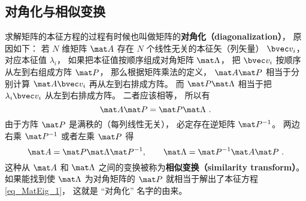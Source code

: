 \subsection{对角化与相似变换}
求解矩阵的本征方程的过程有时候也叫做矩阵的\textbf{对角化（diagonalization）}， 原因如下： 若 $N$ 维矩阵 $\mat A$ 存在 $N$ 个线性无关的本征矢（列矢量） $\bvec v_i$， 对应本征值 $\lambda_i$， 如果把本征值按顺序组成对角矩阵 $\mat \Lambda$， 把 $\bvec v_i$ 按顺序从左到右组成方阵 $\mat P$， 那么根据矩阵乘法的定义， $\mat A \mat P$ 相当于分别计算 $\mat A\bvec v_i$ 再从左到右排成方阵。 而 $\mat P\mat\Lambda$ 相当于把 $\lambda_i\bvec v_i$ 从左到右排成方阵。 二者应该相等， 所以有
\begin{equation}
\mat A \mat P = \mat P\mat\Lambda~.
\end{equation}
由于方阵 $\mat P$ 是满秩的（每列线性无关）， 必定存在逆矩阵%
$\mat P^{-1}$。 两边右乘 $\mat P^{-1}$ 或者左乘 $\mat P$ 得
\begin{equation}\label{eq_MatEig_3}
\mat A = \mat P\mat\Lambda\mat P^{-1}, \qquad
\mat \Lambda = \mat P^{-1}\mat A \mat P~.
\end{equation}
这种从 $\mat A$ 和 $\mat\Lambda$ 之间的变换被称为\textbf{相似变换（similarity transform）}。 如果能找到使 $\mat\Lambda$ 为对角矩阵的 $\mat P$ 就相当于解出了本征方程\autoref{eq_MatEig_1}， 这就是 “对角化” 名字的由来。
